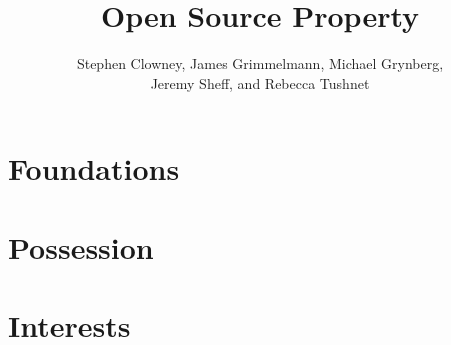 \documentclass[12pt]{book}
\title{Open Source Property}
\author{Stephen Clowney, James Grimmelmann, Michael Grynberg,\\
Jeremy Sheff, and Rebecca Tushnet}
\begin{document}
%
%
\sloppy
\frenchspacing
\raggedbottom
{}

%
%

\frontmatter

\maketitle

\tableofcontents



%
%

\mainmatter


%
%

\part{Foundations}









\part{Possession}












\part{Interests}








\end{document}
